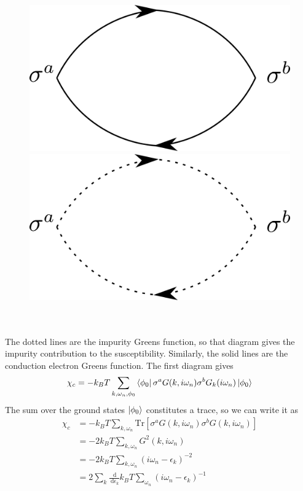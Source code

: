 \documentclass[twoside]{report}
\numberwithin{equation}{section}
\begin{document}
\begin{figure}[tbh!]
\centering
\includegraphics[scale=0.3]{../figures/poppov1.png} 
\includegraphics[scale=0.3]{../figures/poppov2.png}
\end{figure}\\\\
The dotted lines are the impurity Greens function, so that diagram gives the impurity contribution to the susceptibility.
Similarly, the solid lines are the conduction electron Greens function.
The first diagram gives
\begin{equation}\begin{aligned}
\chi_c = -k_B T \sum_{k,\omega_n,\phi_0} \bra{\phi_0} \sigma^a G(k,i\omega_n)\sigma^bG_k(i\omega_n)\ket{\phi_0}
\end{aligned}\end{equation}
The sum over the ground states \(\ket{\phi_0}\) constitutes a trace, so we can write it as
\begin{equation}\begin{aligned}
	\chi_c &= -k_B T \sum_{k,\omega_n} \text{Tr}\left[\sigma^a G(k,i\omega_n)\sigma^bG(k,i\omega_n)\right] \\
       &= -2 k_B T \sum_{k,\omega_n} G^2(k,i\omega_n)\\
       &= -2 k_B T \sum_{k,\omega_n} \left(i\omega_n - \epsilon_k\right)^{-2}\\
       &= 2 \sum_k \frac{\:\mathrm{d}}{\:\mathrm{d}\epsilon_k}k_B T\sum_{\omega_n} \left(i\omega_n - \epsilon_k\right)^{-1}
\end{aligned}\end{equation}
\end{document}
